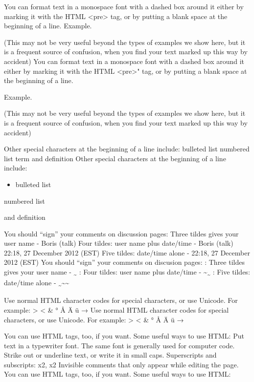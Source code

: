 \documentclass[]{book}
\providecommand{\tightlist}{%
  \setlength{\itemsep}{0pt}\setlength{\parskip}{0pt}}
\begin{document}
You can format text in a monospace font with a dashed box around it
either by marking it with the HTML \textless{}pre\textgreater{} tag, or
by putting a blank space at the beginning of a line. Example.

(This may not be very useful beyond the types of examples we show here,
but it is a frequent source of confusion, when you find your text marked
up this way by accident) You can format text in a monospace font with a
dashed box around it either by marking it with the HTML
\textless{}pre\textgreater{}" tag, or by putting a blank space at the
beginning of a line.

Example.

(This may not be very useful beyond the types of examples we show here,
but it is a frequent source of confusion, when you find your text marked
up this way by accident)

Other special characters at the beginning of a line include: bulleted
list numbered list term and definition Other special characters at the
beginning of a line include:

\begin{itemize}
\tightlist
\item
  bulleted list
\end{itemize}

numbered list

\begin{description}
\tightlist
\item[; term]
and definition
\end{description}

You should ``sign'' your comments on discussion pages: Three tildes
gives your user name - Boris (talk) Four tildes: user name plus
date/time - Boris (talk) 22:18, 27 December 2012 (EST) Five tildes:
date/time alone - 22:18, 27 December 2012 (EST) You should ``sign'' your
comments on discusion pages: : Three tildes gives your user name -
\textsubscript{\textasciitilde{}} : Four tildes: user name plus
date/time - \textasciitilde{}\textsubscript{\textasciitilde{}} : Five
tildes: date/time alone -
\textsubscript{\textasciitilde{}}\textasciitilde{}\textasciitilde{}

Use normal HTML character codes for special characters, or use Unicode.
For example: \textgreater{} \textless{} \& ° Å Ä ü → Use normal HTML
character codes for special characters, or use Unicode. For example:
\textgreater{} \textless{} \& ° Å Ä ü →

You can use HTML tags, too, if you want. Some useful ways to use HTML:
Put text in a typewriter font. The same font is generally used for
computer code. Strike out or underline text, or write it in small caps.
Superscripts and subscripts: x2, x2 Invisible comments that only appear
while editing the page. You can use HTML tags, too, if you want. Some
useful ways to use HTML:
\end{document}
